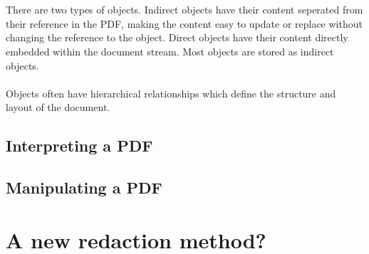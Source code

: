 \\\\
There are two types of objects. Indirect objects have their content seperated from their reference in the PDF, making the content easy to update or replace without changing the reference to the object. Direct objects have their content directly embedded within the document stream. Most objects are stored as indirect objects. 
\\\\
Objects often have hierarchical relationships which define the structure and layout of the document. 

\subsection{Interpreting a PDF}
\subsection{Manipulating a PDF}

\section{A new redaction method?}
